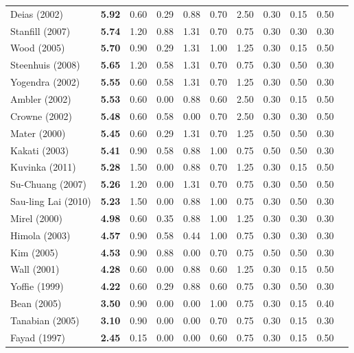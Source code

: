 \documentclass[final,5p,times,twocolumn]{elsarticle}
\begin{document}
\begin{longtable}{|l|c|c|c|c|c|c|c|c|c|c|}
Deias  (2002) & \textbf{5.92} & 0.60  & 0.29  & 0.88  & 0.70  & 2.50  & 0.30  & 0.15  & 0.50  & \cite{Deias} \\
Stanfill (2007) & \textbf{5.74} & 1.20  & 0.88  & 1.31  & 0.70  & 0.75  & 0.30  & 0.30  & 0.30  & \cite{Stanfill2007} \\
Wood (2005) & \textbf{5.70} & 0.90  & 0.29  & 1.31  & 1.00  & 1.25  & 0.30  & 0.15  & 0.50  & \cite{Wood2005} \\
Steenhuis (2008) & \textbf{5.65} & 1.20  & 0.58  & 1.31  & 0.70  & 0.75  & 0.30  & 0.50  & 0.30  & \cite{Steenhuis2008} \\
Yogendra (2002) & \textbf{5.55} & 0.60  & 0.58  & 1.31  & 0.70  & 1.25  & 0.30  & 0.50  & 0.30  & \cite{Yogendra2002} \\
Ambler (2002) & \textbf{5.53} & 0.60  & 0.00  & 0.88  & 0.60  & 2.50  & 0.30  & 0.15  & 0.50  & \cite{Ambler2002} \\
Crowne (2002) & \textbf{5.48} & 0.60  & 0.58  & 0.00  & 0.70  & 2.50  & 0.30  & 0.30  & 0.50  & \cite{Crowne2002} \\
Mater (2000) & \textbf{5.45} & 0.60  & 0.29  & 1.31  & 0.70  & 1.25  & 0.50  & 0.50  & 0.30  & \cite{Mater2000} \\
Kakati (2003) & \textbf{5.41} & 0.90  & 0.58  & 0.88  & 1.00  & 0.75  & 0.50  & 0.50  & 0.30  & \cite{Kakati2003} \\
Kuvinka (2011) & \textbf{5.28} & 1.50  & 0.00  & 0.88  & 0.70  & 1.25  & 0.30  & 0.15  & 0.50  & \cite{Kuvinka2011} \\
Su-Chuang (2007) & \textbf{5.26} & 1.20  & 0.00  & 1.31  & 0.70  & 0.75  & 0.30  & 0.50  & 0.50  & \cite{Su-Chan2007} \\
Sau-ling Lai (2010) & \textbf{5.23} & 1.50  & 0.00  & 0.88  & 1.00  & 0.75  & 0.30  & 0.50  & 0.30  & \cite{Lai2010} \\
Mirel (2000) & \textbf{4.98} & 0.60  & 0.35  & 0.88  & 1.00  & 1.25  & 0.30  & 0.30  & 0.30  & \cite{Mirel2000} \\
Himola (2003) & \textbf{4.57} & 0.90  & 0.58  & 0.44  & 1.00  & 0.75  & 0.30  & 0.30  & 0.30  & \cite{Hilmola2003} \\
Kim (2005) & \textbf{4.53} & 0.90  & 0.88  & 0.00  & 0.70  & 0.75  & 0.50  & 0.50  & 0.30  & \cite{Kim2005} \\
Wall (2001) & \textbf{4.28} & 0.60  & 0.00  & 0.88  & 0.60  & 1.25  & 0.30  & 0.15  & 0.50  & \cite{Wall2001} \\
Yoffie (1999) & \textbf{4.22} & 0.60  & 0.29  & 0.88  & 0.60  & 0.75  & 0.30  & 0.50  & 0.30  & \cite{Yoffie1999} \\
Bean (2005) & \textbf{3.50} & 0.90  & 0.00  & 0.00  & 1.00  & 0.75  & 0.30  & 0.15  & 0.40  & \cite{Bean2005} \\
Tanabian (2005) & \textbf{3.10} & 0.90  & 0.00  & 0.00  & 0.70  & 0.75  & 0.30  & 0.15  & 0.30  & \cite{Tanabian2005} \\
Fayad (1997) & \textbf{2.45} & 0.15  & 0.00  & 0.00  & 0.60  & 0.75  & 0.30  & 0.15  & 0.50  & \cite{Fayad1997} \\
\hline 



\end{longtable}
\end{document}
